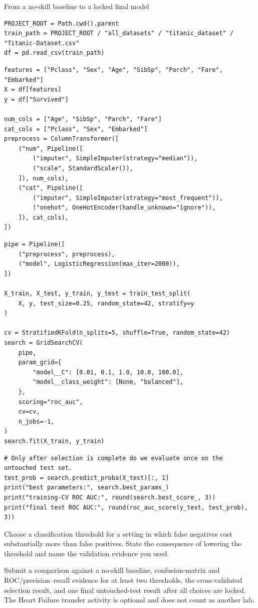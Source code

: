 \begin{labproject}{From a no-skill baseline to a locked final model}
\begin{lstlisting}[style=mlpython]
PROJECT_ROOT = Path.cwd().parent
train_path = PROJECT_ROOT / "all_datasets" / "titanic_dataset" / "Titanic-Dataset.csv"
df = pd.read_csv(train_path)
\end{lstlisting}

\begin{lstlisting}[style=mlpython]
features = ["Pclass", "Sex", "Age", "SibSp", "Parch", "Fare", "Embarked"]
X = df[features]
y = df["Survived"]

num_cols = ["Age", "SibSp", "Parch", "Fare"]
cat_cols = ["Pclass", "Sex", "Embarked"]
preprocess = ColumnTransformer([
    ("num", Pipeline([
        ("imputer", SimpleImputer(strategy="median")),
        ("scale", StandardScaler()),
    ]), num_cols),
    ("cat", Pipeline([
        ("imputer", SimpleImputer(strategy="most_frequent")),
        ("onehot", OneHotEncoder(handle_unknown="ignore")),
    ]), cat_cols),
])
\end{lstlisting}

\begin{lstlisting}[style=mlpython]
pipe = Pipeline([
    ("preprocess", preprocess),
    ("model", LogisticRegression(max_iter=2000)),
])

X_train, X_test, y_train, y_test = train_test_split(
    X, y, test_size=0.25, random_state=42, stratify=y
)

cv = StratifiedKFold(n_splits=5, shuffle=True, random_state=42)
search = GridSearchCV(
    pipe,
    param_grid={
        "model__C": [0.01, 0.1, 1.0, 10.0, 100.0],
        "model__class_weight": [None, "balanced"],
    },
    scoring="roc_auc",
    cv=cv,
    n_jobs=-1,
)
search.fit(X_train, y_train)
\end{lstlisting}

\begin{lstlisting}[style=mlpython]
# Only after selection is complete do we evaluate once on the untouched test set.
test_prob = search.predict_proba(X_test)[:, 1]
print("best parameters:", search.best_params_)
print("training-CV ROC AUC:", round(search.best_score_, 3))
print("final test ROC AUC:", round(roc_auc_score(y_test, test_prob), 3))
\end{lstlisting}

\begin{decisionmemo}
Choose a classification threshold for a setting in which false negatives cost substantially more than false positives. State the consequence of lowering the threshold and name the validation evidence you used.
\end{decisionmemo}
\end{labproject}

\begin{labdeliverable}
Submit a comparison against a no-skill baseline, confusion-matrix and ROC/precision--recall evidence for at least two thresholds, the cross-validated selection result, and one final untouched-test result after all choices are locked. The Heart Failure transfer activity is optional and does not count as another lab.
\end{labdeliverable}
